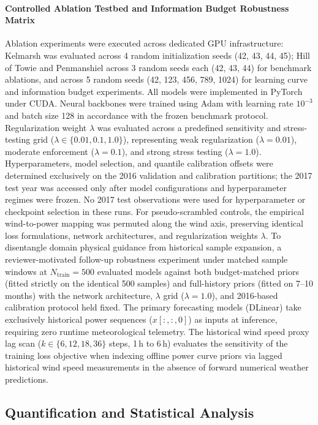 \paragraph*{Controlled Ablation Testbed and Information Budget Robustness Matrix}
Ablation experiments were executed across dedicated GPU infrastructure: Kelmarsh was evaluated across 4 random initialization seeds (42, 43, 44, 45); Hill of Towie and Penmanshiel across 3 random seeds each (42, 43, 44) for benchmark ablations, and across 5 random seeds (42, 123, 456, 789, 1024) for learning curve and information budget experiments. All models were implemented in PyTorch under CUDA. Neural backbones were trained using Adam with learning rate $10^{-3}$ and batch size 128 in accordance with the frozen benchmark protocol. Regularization weight $\lambda$ was evaluated across a predefined sensitivity and stress-testing grid ($\lambda \in \{0.01, 0.1, 1.0\}$), representing weak regularization ($\lambda=0.01$), moderate enforcement ($\lambda=0.1$), and strong stress testing ($\lambda=1.0$). Hyperparameters, model selection, and quantile calibration offsets were determined exclusively on the 2016 validation and calibration partitions; the 2017 test year was accessed only after model configurations and hyperparameter regimes were frozen. No 2017 test observations were used for hyperparameter or checkpoint selection in these runs. For pseudo-scrambled controls, the empirical wind-to-power mapping was permuted along the wind axis, preserving identical loss formulations, network architectures, and regularization weights $\lambda$. To disentangle domain physical guidance from historical sample expansion, a reviewer-motivated follow-up robustness experiment under matched sample windows at $N_{\text{train}}=500$ evaluated models against both budget-matched priors (fitted strictly on the identical 500 samples) and full-history priors (fitted on 7--10 months) with the network architecture, $\lambda$ grid ($\lambda=1.0$), and 2016-based calibration protocol held fixed. The primary forecasting models (DLinear) take exclusively historical power sequences ($x[:, :, 0]$) as inputs at inference, requiring zero runtime meteorological telemetry. The historical wind speed proxy lag scan ($k \in \{6, 12, 18, 36\}$ steps, 1\,h to 6\,h) evaluates the sensitivity of the training loss objective when indexing offline power curve priors via lagged historical wind speed measurements in the absence of forward numerical weather predictions.

\subsection*{Quantification and Statistical Analysis}

